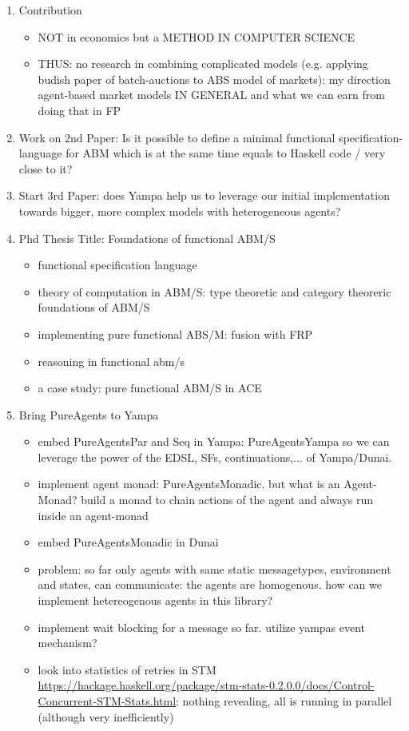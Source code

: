 \begin{enumerate}
\item Contribution
	\begin{itemize}    
    \item NOT in economics but a METHOD IN COMPUTER SCIENCE
    \item THUS: no research in combining complicated models (e.g. applying budish paper of batch-auctions to ABS model of markets): my direction agent-based market models IN GENERAL and what we can earn from doing that in FP
	\end{itemize}
	
\item Work on 2nd Paper: Is it possible to define a minimal functional specification-language for ABM which is at the same time equals to Haskell code / very close to it? 

\item Start 3rd Paper: does Yampa help us to leverage our initial implementation towards bigger, more complex models with heterogeneous agents?

\item Phd Thesis Title: Foundations of functional ABM/S
	\begin{itemize}
		\item functional specification language
		\item theory of computation in ABM/S: type theoretic and category theoreric foundations of ABM/S
		\item implementing pure functional ABS/M: fusion with FRP
		\item reasoning in functional abm/s
		\item a case study: pure functional ABM/S in ACE
	\end{itemize}

\item Bring PureAgents to Yampa
	\begin{itemize}
		\item embed PureAgentsPar and Seq in Yampa: PureAgentsYampa so we can leverage the power of the EDSL, SFs, continuations,... of Yampa/Dunai.
		\item implement agent monad: PureAgentsMonadic. but what is an Agent-Monad? build a monad to chain actions of the agent and always run inside an agent-monad
		\item embed PureAgentsMonadic in Dunai
		\item problem: so far only agents with same static messagetypes, environment and states, can communicate: the agents are homogenous. how can we implement hetereogenous agents in this library?
		\item implement wait blocking for a message so far. utilize yampas event mechanism?
		\item look into statistics of retries in STM \url{https://hackage.haskell.org/package/stm-stats-0.2.0.0/docs/Control-Concurrent-STM-Stats.html}: nothing revealing, all is running in parallel (although very inefficiently)
	\end{itemize}


\end{enumerate}
